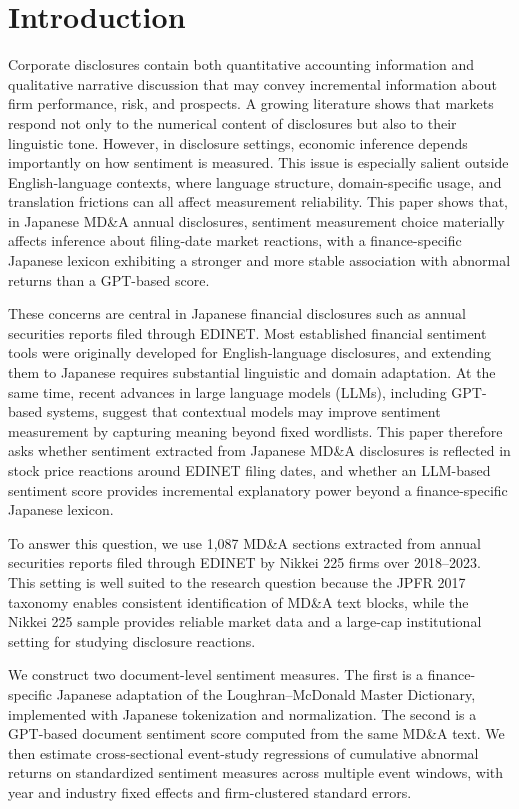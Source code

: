 \section{Introduction}
\label{sec:introduction}

Corporate disclosures contain both quantitative accounting information and qualitative narrative discussion that may convey incremental information about firm performance, risk, and prospects. A growing literature shows that markets respond not only to the numerical content of disclosures but also to their linguistic tone. However, in disclosure settings, economic inference depends importantly on how sentiment is measured. This issue is especially salient outside English-language contexts, where language structure, domain-specific usage, and translation frictions can all affect measurement reliability. This paper shows that, in Japanese MD\&A annual disclosures, sentiment measurement choice materially affects inference about filing-date market reactions, with a finance-specific Japanese lexicon exhibiting a stronger and more stable association with abnormal returns than a GPT-based score.

These concerns are central in Japanese financial disclosures such as annual securities reports filed through EDINET. Most established financial sentiment tools were originally developed for English-language disclosures, and extending them to Japanese requires substantial linguistic and domain adaptation. At the same time, recent advances in large language models (LLMs), including GPT-based systems, suggest that contextual models may improve sentiment measurement by capturing meaning beyond fixed wordlists. This paper therefore asks whether sentiment extracted from Japanese MD\&A disclosures is reflected in stock price reactions around EDINET filing dates, and whether an LLM-based sentiment score provides incremental explanatory power beyond a finance-specific Japanese lexicon.

To answer this question, we use 1,087 MD\&A sections extracted from annual securities reports filed through EDINET by Nikkei 225 firms over 2018--2023. This setting is well suited to the research question because the JPFR 2017 taxonomy enables consistent identification of MD\&A text blocks, while the Nikkei 225 sample provides reliable market data and a large-cap institutional setting for studying disclosure reactions.

We construct two document-level sentiment measures. The first is a finance-specific Japanese adaptation of the Loughran--McDonald Master Dictionary, implemented with Japanese tokenization and normalization. The second is a GPT-based document sentiment score computed from the same MD\&A text. We then estimate cross-sectional event-study regressions of cumulative abnormal returns on standardized sentiment measures across multiple event windows, with year and industry fixed effects and firm-clustered standard errors.

